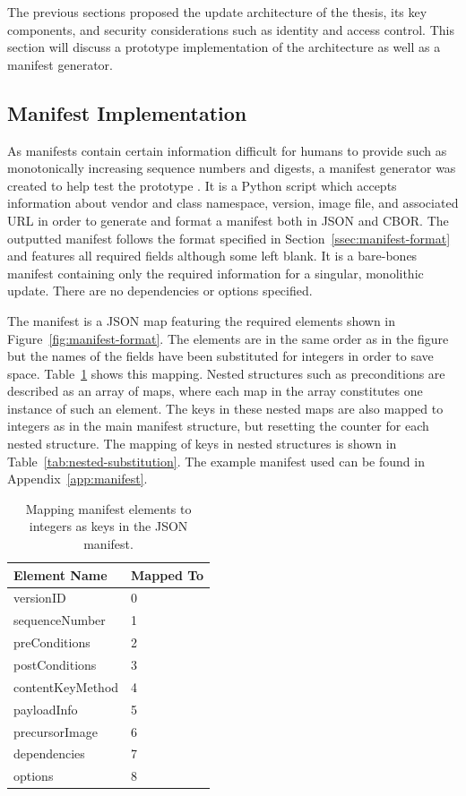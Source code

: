 \documentclass[0-thesis.tex]{subfiles}
\begin{document}
The previous sections proposed the update architecture of the thesis, its key components,
and security considerations such as identity and access control. This section will discuss
a prototype implementation of the architecture as well as a manifest generator. 

\subsection{Manifest Implementation}
\label{ssec:manifest-implementation}
As manifests contain certain information difficult for humans to provide such as
monotonically increasing sequence numbers and digests, a manifest generator was created to
help test the prototype \parencite{manifest-generator}. It is a Python script which
accepts information about vendor and class namespace, version, image file, and associated
URL in order to generate and format a manifest both in JSON and CBOR. The outputted
manifest follows the format specified in Section~\ref{ssec:manifest-format} and features
all required fields although some left blank. It is a bare-bones manifest containing only
the required information for a singular, monolithic update. There are no dependencies or
options specified.

The manifest is a JSON map featuring the required elements shown in
Figure~\ref{fig:manifest-format}. The elements are in the same order as in the figure but
the names of the fields have been substituted for integers in order to save space.
Table~\ref{tab:manifest-substitution} shows this mapping. Nested structures such as
preconditions are described as an array of maps, where each map in the array constitutes
one instance of such an element. The keys in these nested maps are also mapped to integers
as in the main manifest structure, but resetting the counter for each nested structure.
The mapping of keys in nested structures is shown in Table~\ref{tab:nested-substitution}.
The example manifest used can be found in Appendix~\ref{app:manifest}. 

\begin{longtable}[]{@{}ll@{}}
    \caption{Mapping manifest elements to integers as keys in the JSON manifest.}
    \label{tab:manifest-substitution}\\
    \toprule
    Element Name & Mapped To\tabularnewline
    \midrule
    \endhead
    versionID & 0\tabularnewline
    sequenceNumber & 1\tabularnewline
    preConditions & 2\tabularnewline
    postConditions & 3\tabularnewline
    contentKeyMethod & 4\tabularnewline
    payloadInfo & 5\tabularnewline
    precursorImage & 6\tabularnewline
    dependencies & 7\tabularnewline
    options & 8\tabularnewline
    \bottomrule
\end{longtable}
\end{document}
